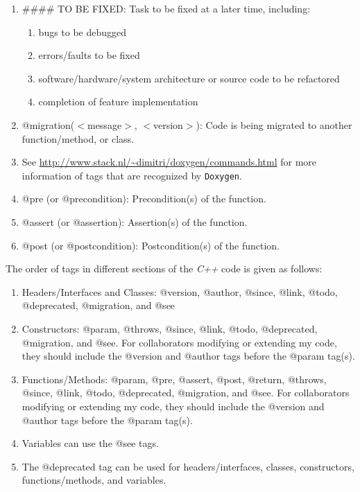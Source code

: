 \documentclass[letter,12pt]{article}
\begin{document}
\begin{enumerate}
\item \#\#\#\# TO BE FIXED: Task to be fixed at a later time, including: \vspace{-0.3cm}
	\begin{enumerate} \itemsep -2pt
	\item bugs to be debugged
	\item errors/faults to be fixed
	\item software/hardware/system architecture or source code to be refactored
	\item completion of feature implementation
	\end{enumerate}
\item @migration($<$message$>$, $<$version$>$): Code is being migrated to another function/method, or class.
\item See \url{http://www.stack.nl/~dimitri/doxygen/commands.html} for more information of tags that are recognized by {\tt Doxygen}.
\item @pre (or @precondition): Precondition(s) of the function.
\item @assert (or @assertion): Assertion(s) of the function.
\item @post (or @postcondition): Postcondition(s) of the function.
\end{enumerate}

The order of tags in different sections of the {\it C++} code is given as follows: \vspace{-0.3cm}
\begin{enumerate} \itemsep -4pt
\item Headers/Interfaces and Classes: @version, @author, @since, @link, @todo, @deprecated, @migration, and @see
\item Constructors: @param, @throws, @since, @link, @todo, @deprecated, @migration, and @see. For collaborators modifying or extending my code, they should include the @version and @author tags before the @param tag(s).
\item Functions/Methods: @param, @pre, @assert, @post, @return, @throws, @since, @link, @todo, @deprecated, @migration, and @see. For collaborators modifying or extending my code, they should include the @version and @author tags before the @param tag(s).
\item Variables can use the @see tags.
\item The @deprecated tag can be used for headers/interfaces, classes, constructors, functions/methods, and variables.
\end{enumerate}
\end{document}
